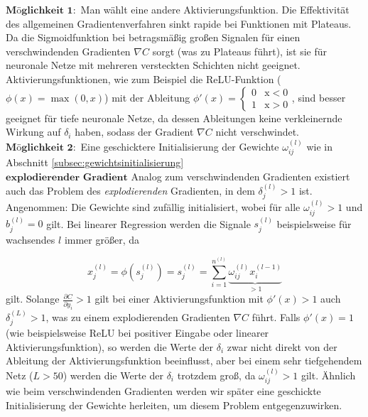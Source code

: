 $\textbf{Möglichkeit 1}:$ Man wählt eine andere Aktivierungsfunktion. Die Effektivität des allgemeinen
Gradientenverfahren sinkt rapide bei Funktionen mit Plateaus. Da die Sigmoidfunktion bei betragsmäßig großen Signalen
für einen verschwindenden Gradienten $\nabla C$ sorgt (was zu Plateaus führt), ist sie für neuronale Netze mit mehreren
versteckten Schichten nicht geeignet. Aktivierungsfunktionen, wie zum Beispiel die ReLU-Funktion ($\phi(x)=\max(0,x)$) mit
der Ableitung $\phi'(x)= \begin {cases} 0 &\text{x}<0\\ 1 &\text{x}>0\end{cases}$, sind besser geeignet für tiefe neuronale
Netze, da dessen Ableitungen keine verkleinernde Wirkung auf $\delta_i$ haben, sodass der Gradient $\nabla C$ nicht
verschwindet.\\
$\textbf{Möglichkeit 2}:$ Eine geschicktere Initialisierung der Gewichte $\omega_{ij}^{(l)}$ wie in Abschnitt
\eqref{subsec:gewichtsinitialisierung}\\
$\textbf{explodierender Gradient}$
Analog zum verschwindenden Gradienten existiert auch das Problem des \textit{explodierenden} Gradienten, in dem
$\delta_j^{(l)}>1$ ist.\\
Angenommen: Die Gewichte sind zufällig initialisiert, wobei für alle $\omega_{ij}^{(l)}>1$ und $b_j^{(l)}=0$
gilt. Bei linearer Regression werden die Signale $s_j^{(l)}$  beispielsweise für wachsendes $l$ immer größer, da

\[
    x_j^{(l)}=\phi(s_j^{(l)})=s_j^{(l)}=\sum\limits_{i=1}^{n^{(l)}} \underbrace{\omega_{ij}^{(l)}x_{i}^{(l-1)}}_{>1}
\]
gilt. Solange $\frac{\partial C}{\partial y_i} > 1$ gilt bei einer Aktivierungsfunktion mit $\phi'(x)>1$ auch $\delta_j^{(L)}>1$,
was zu einem explodierenden Gradienten $\nabla C$ führt. Falls $\phi'(x)=1$ (wie beispielsweise ReLU bei positiver Eingabe oder
linearer Aktivierungsfunktion), so werden die Werte der $\delta_i$ zwar nicht direkt von der Ableitung der
Aktivierungsfunktion beeinflusst, aber bei einem sehr tiefgehendem Netz ($L>50$) werden die Werte der $\delta_i$ trotzdem
groß, da $\omega_{ij}^{(l)}>1$ gilt. Ähnlich wie beim verschwindenden Gradienten werden wir später eine geschickte
Initialisierung der Gewichte herleiten, um diesem Problem entgegenzuwirken.

